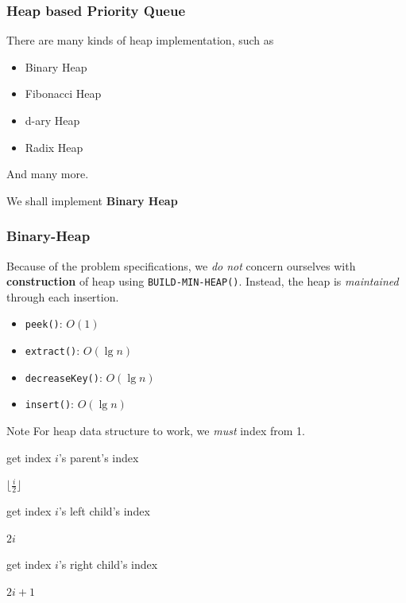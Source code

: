 \documentclass{beamer}
\begin{document}
\begin{frame}
	\frametitle{Heap based Priority Queue}
	There are many kinds of heap implementation, such as
	\begin{itemize}
		\item Binary Heap
		\item Fibonacci Heap
		\item d-ary Heap
		\item Radix Heap
	\end{itemize}
	And many more. \newline

	We shall implement \textbf{Binary Heap} 
\end{frame}

\begin{frame}
	\frametitle{Binary-Heap}
	Because of the problem specifications, we \emph{do not} concern ourselves with \textbf{construction} of heap using \texttt{BUILD-MIN-HEAP()}. Instead, the heap is \emph{maintained} through each insertion.
	\begin{itemize}
		\item \texttt{peek()}: \( O(1) \) 
		\item \texttt{extract()}: \( O(\lg{n}) \) 
		\item \texttt{decreaseKey()}: \( O(\lg{n}) \) 
		\item \texttt{insert()}: \( O(\lg{n}) \) 
	\end{itemize}

	\begin{block}{Note}
		For heap data structure to work, we \emph{must} index from 1.	
	\end{block}
\end{frame}

\begin{frame}
	\begin{algorithm}[H]
		\caption{get index \( i \)'s parent's index}
		\begin{algorithmic}[1]
			\State \Return \( \lfloor \frac{ i }{ 2 }  \rfloor \) 
			\EndFunction
		\end{algorithmic}
	\end{algorithm}	

	\begin{algorithm}[H]
		\caption{get index \( i \)'s left child's index}
		\begin{algorithmic}[1]
			\State \Return \( 2i \)  
			\EndFunction
		\end{algorithmic}
	\end{algorithm}	

	\begin{algorithm}[H]
		\caption{get index \( i \)'s right child's index}
		\begin{algorithmic}[1]
			\State \Return \( 2i+1 \)  
			\EndFunction
		\end{algorithmic}
	\end{algorithm}	
\end{frame}
\end{document}
